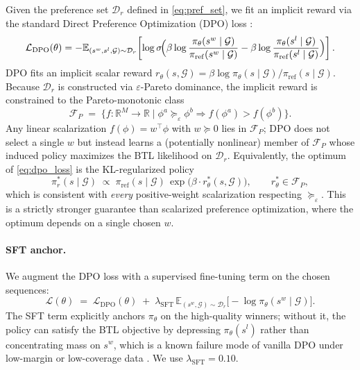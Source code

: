 Given the preference set $\mathcal{D}_r$ defined in \eqref{eq:pref_set}, we fit an implicit reward via the standard Direct Preference Optimization (DPO) loss \citep{rafailov2023direct}:
\begin{equation}
\mathcal{L}_{\mathrm{DPO}}(\theta)
= -\mathbb{E}_{(s^w, s^l, \mathcal{G})\sim \mathcal{D}_r}\!\left[
\log \sigma \!\Bigl(
\beta \log \frac{\pi_\theta(s^w \mid \mathcal{G})}{\pi_{\mathrm{ref}}(s^w \mid \mathcal{G})}
-
\beta \log \frac{\pi_\theta(s^l \mid \mathcal{G})}{\pi_{\mathrm{ref}}(s^l \mid \mathcal{G})}
\Bigr)
\right].
\label{eq:dpo_loss}
\end{equation}
DPO fits an implicit scalar reward $r_\theta(s,\mathcal{G}) = \beta \log \pi_\theta(s\mid\mathcal{G})/\pi_{\mathrm{ref}}(s\mid\mathcal{G})$. Because $\mathcal{D}_r$ is constructed via $\varepsilon$-Pareto dominance, the implicit reward is constrained to the Pareto-monotonic class
\begin{equation}
\mathcal{F}_P \;=\; \big\{f:\mathbb{R}^M \to \mathbb{R} \;\big|\; \phi^a \succeq_{\varepsilon} \phi^b \Rightarrow f(\phi^a) > f(\phi^b)\big\}.
\label{eq:pareto_class}
\end{equation}
Any linear scalarization $f(\phi) = w^\top \phi$ with $w \succeq 0$ lies in $\mathcal{F}_P$; DPO does not select a single $w$ but instead learns a (potentially nonlinear) member of $\mathcal{F}_P$ whose induced policy maximizes the BTL likelihood on $\mathcal{D}_r$. Equivalently, the optimum of \eqref{eq:dpo_loss} is the KL-regularized policy
\begin{equation}
\pi^*_r(s\mid \mathcal{G}) \;\propto\; \pi_{\mathrm{ref}}(s\mid \mathcal{G})\, \exp\!\big(\beta \cdot r_\theta^*(s,\mathcal{G})\big),\qquad r_\theta^* \in \mathcal{F}_P,
\label{eq:pareto_policy}
\end{equation}
which is consistent with \emph{every} positive-weight scalarization respecting $\succeq_{\varepsilon}$. This is a strictly stronger guarantee than scalarized preference optimization, where the optimum depends on a single chosen $w$.

\paragraph{SFT anchor.}
We augment the DPO loss with a supervised fine-tuning term on the chosen sequences:
\begin{equation}
\mathcal{L}(\theta)
\;=\; \mathcal{L}_{\mathrm{DPO}}(\theta)
\;+\; \lambda_{\mathrm{SFT}}\,
\mathbb{E}_{(s^w,\mathcal{G})\sim \mathcal{D}_r}\!\big[-\log \pi_\theta(s^w \mid \mathcal{G})\big].
\label{eq:sft_anchor}
\end{equation}
The SFT term explicitly anchors $\pi_\theta$ on the high-quality winners; without it, the policy can satisfy the BTL objective by depressing $\pi_\theta(s^l)$ rather than concentrating mass on $s^w$, which is a known failure mode of vanilla DPO under low-margin or low-coverage data \citep{Pan2025WhatMI}. We use $\lambda_{\mathrm{SFT}}=0.10$.

